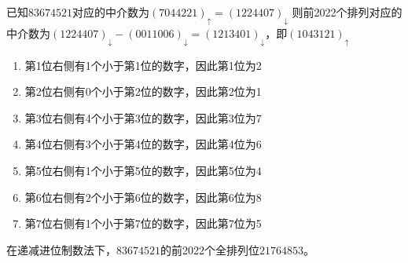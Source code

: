 \documentclass[UTF8]{ctexart}
\begin{document}
    已知$83674521$对应的中介数为$(7044221)_\uparrow = (1224407)_\downarrow$
    则前2022个排列对应的中介数为$(1224407)_\downarrow - (0011006)_\downarrow = (1213401)_\downarrow$，即$(1043121)_\uparrow$

    \begin{enumerate}[label=\textit{第\arabic*步}, itemsep=0.2em]
        \item 第1位右侧有1个小于第1位的数字，因此第1位为2
        \item 第2位右侧有0个小于第2位的数字，因此第2位为1
        \item 第3位右侧有4个小于第3位的数字，因此第3位为7
        \item 第4位右侧有3个小于第4位的数字，因此第4位为6
        \item 第5位右侧有1个小于第5位的数字，因此第5位为4
        \item 第6位右侧有2个小于第6位的数字，因此第6位为8
        \item 第7位右侧有1个小于第7位的数字，因此第7位为5
    \end{enumerate}

    在递减进位制数法下，$83674521$的前2022个全排列位$21764853$。
\end{document}
